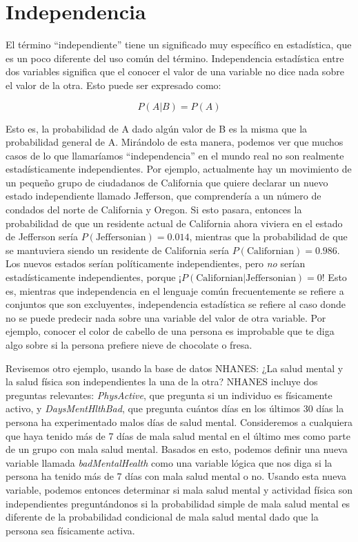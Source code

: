 \documentclass[
  12pt,
]{book}
\theoremstyle{definition}
\theoremstyle{definition}
\theoremstyle{definition}
\theoremstyle{remark}
\begin{document}
\hypertarget{independencia}{%
\section{Independencia}\label{independencia}}

El término ``independiente'' tiene un significado muy específico en estadística, que es un poco diferente del uso común del término. Independencia estadística entre dos variables significa que el conocer el valor de una variable no dice nada sobre el valor de la otra. Esto puede ser expresado como:

\[
P(A|B) = P(A)
\]

Esto es, la probabilidad de A dado algún valor de B es la misma que la probabilidad general de A. Mirándolo de esta manera, podemos ver que muchos casos de lo que llamaríamos ``independencia'' en el mundo real no son realmente estadísticamente independientes. Por ejemplo, actualmente hay un movimiento de un pequeño grupo de ciudadanos de California que quiere declarar un nuevo estado independiente llamado Jefferson, que comprendería a un número de condados del norte de California y Oregon. Si esto pasara, entonces la probabilidad de que un residente actual de California ahora viviera en el estado de Jefferson sería \(P(\text{Jeffersonian})=0.014\), mientras que la probabilidad de que se mantuviera siendo un residente de California sería \(P(\text{Californian})=0.986\). Los nuevos estados serían políticamente independientes, pero \emph{no} serían estadísticamente independientes, porque ¡\(P(\text{Californian|Jeffersonian}) = 0\)! Esto es, mientras que independencia en el lenguaje común frecuentemente se refiere a conjuntos que son excluyentes, independencia estadística se refiere al caso donde no se puede predecir nada sobre una variable del valor de otra variable. Por ejemplo, conocer el color de cabello de una persona es improbable que te diga algo sobre si la persona prefiere nieve de chocolate o fresa.

Revisemos otro ejemplo, usando la base de datos NHANES: ¿La salud mental y la salud física son independientes la una de la otra? NHANES incluye dos preguntas relevantes: \emph{PhysActive}, que pregunta si un individuo es físicamente activo, y \emph{DaysMentHlthBad}, que pregunta cuántos días en los últimos 30 días la persona ha experimentado malos días de salud mental. Consideremos a cualquiera que haya tenido más de 7 días de mala salud mental en el último mes como parte de un grupo con mala salud mental. Basados en esto, podemos definir una nueva variable llamada \emph{badMentalHealth} como una variable lógica que nos diga si la persona ha tenido más de 7 días con mala salud mental o no. Usando esta nueva variable, podemos entonces determinar si mala salud mental y actividad física son independientes preguntándonos si la probabilidad simple de mala salud mental es diferente de la probabilidad condicional de mala salud mental dado que la persona sea físicamente activa.
\end{document}
